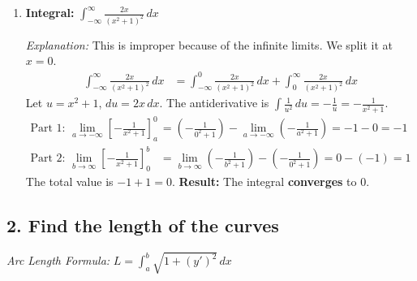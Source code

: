 \documentclass[12pt]{article}
\newcommand{\questiontitle}[1]{\subsection*{#1}}
\begin{document}
\begin{enumerate}[label=\alph*.]
    \item \textbf{Integral: } $\displaystyle \int_{-\infty}^{\infty} \frac{2x}{(x^2+1)^2} \,dx$
    
    \textit{Explanation:} This is improper because of the infinite limits. We split it at $x=0$.
    \begin{align*}
        \int_{-\infty}^{\infty} \frac{2x}{(x^2+1)^2} \,dx &= \int_{-\infty}^{0} \frac{2x}{(x^2+1)^2} \,dx + \int_{0}^{\infty} \frac{2x}{(x^2+1)^2} \,dx
    \end{align*}
    Let $u = x^2+1$, $du = 2x\,dx$. The antiderivative is $\int \frac{1}{u^2} \,du = -\frac{1}{u} = -\frac{1}{x^2+1}$.
    \begin{align*}
        \text{Part 1: } \lim_{a \to -\infty} \left[ -\frac{1}{x^2+1} \right]_{a}^{0} &= \left(-\frac{1}{0^2+1}\right) - \lim_{a \to -\infty}\left(-\frac{1}{a^2+1}\right) = -1 - 0 = -1 \\
        \text{Part 2: } \lim_{b \to \infty} \left[ -\frac{1}{x^2+1} \right]_{0}^{b} &= \lim_{b \to \infty}\left(-\frac{1}{b^2+1}\right) - \left(-\frac{1}{0^2+1}\right) = 0 - (-1) = 1
    \end{align*}
    The total value is $-1 + 1 = 0$.
    \textbf{Result:} The integral \textbf{converges} to $0$.
\end{enumerate}

\newpage
\questiontitle{2. Find the length of the curves}

\textit{Arc Length Formula:} $L = \displaystyle \int_{a}^{b} \sqrt{1 + (y')^2} \,dx$
\end{document}

